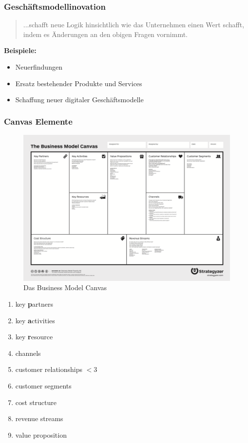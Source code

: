 \documentclass[a4paper]{article}
\begin{document}
			\subsubsection{Geschäftsmodellinovation}
			
			\begin{quote}
				...schafft neue Logik hinsichtlich wie das Unternehmen einen Wert schafft, indem es Änderungen an den obigen Fragen vornimmt.
			\end{quote}
			\bigskip
			
			\textbf{Beispiele:}
			\begin{itemize}
				\item Neuerfindungen 
				\item Ersatz bestehender Produkte und Services 
				\item Schaffung neuer digitaler Geschäftsmodelle
			\end{itemize}
			
			\hrulefill
			
			\subsubsection{Canvas Elemente}
			\begin{figure}[H]
				\centering
				\includegraphics[width=1\textwidth]{canvas}
				\caption{Das Business Model Canvas}
			\end{figure}
			
			\begin{enumerate}
				\item key \textbf{p}artners 
				\item key \textbf{a}ctivities 
				\item key \textbf{r}esource 
				\item channels
				\item customer relationships $<$3
				\item customer segments 
				\item cost structure 
				\item revenue streams 
				\item value proposition
			\end{enumerate}
			
\end{document}
